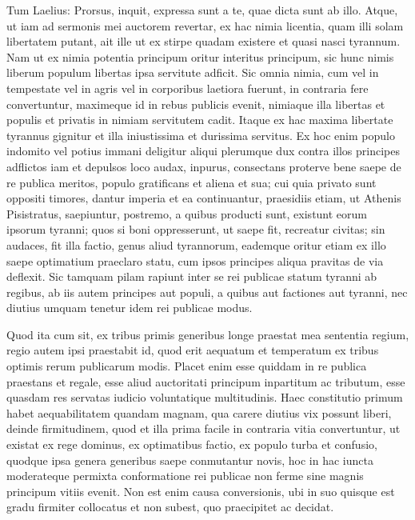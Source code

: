  Tum Laelius: Prorsus, inquit, expressa sunt a te, quae dicta sunt ab illo. Atque, ut iam ad sermonis mei auctorem revertar, ex hac nimia licentia, quam illi solam libertatem putant, ait ille ut ex stirpe quadam existere et quasi nasci tyrannum. Nam ut ex nimia potentia principum oritur interitus principum, sic hunc nimis liberum populum libertas ipsa servitute adficit. Sic omnia nimia, cum vel in tempestate vel in agris vel in corporibus laetiora fuerunt, in contraria fere convertuntur, maximeque id in rebus publicis evenit, nimiaque illa libertas et populis et privatis in nimiam servitutem cadit. Itaque ex hac maxima libertate tyrannus gignitur et illa iniustissima et durissima servitus. Ex hoc enim populo indomito vel potius immani deligitur aliqui plerumque dux contra illos principes adflictos iam et depulsos loco audax, inpurus, consectans proterve bene saepe de re publica meritos, populo gratificans et aliena et sua; cui quia privato sunt oppositi timores, dantur imperia et ea continuantur, praesidiis etiam, ut Athenis Pisistratus, saepiuntur, postremo, a quibus producti sunt, existunt eorum ipsorum tyranni; quos si boni oppresserunt, ut saepe fit, recreatur civitas; sin audaces, fit illa factio, genus aliud tyrannorum, eademque oritur etiam ex illo saepe optimatium praeclaro statu, cum ipsos principes aliqua pravitas de via deflexit. Sic tamquam pilam rapiunt inter se rei publicae statum tyranni ab regibus, ab iis autem principes aut populi, a quibus aut factiones aut tyranni, nec diutius umquam tenetur idem rei publicae modus.

 Quod ita cum sit, ex tribus primis generibus longe praestat mea sententia regium, regio autem ipsi praestabit id, quod erit aequatum et temperatum ex tribus optimis rerum publicarum modis. Placet enim esse quiddam in re publica praestans et regale, esse aliud auctoritati principum inpartitum ac tributum, esse quasdam res servatas iudicio voluntatique multitudinis. Haec constitutio primum habet aequabilitatem quandam magnam, qua carere diutius vix possunt liberi, deinde firmitudinem, quod et illa prima facile in contraria vitia convertuntur, ut existat ex rege dominus, ex optimatibus factio, ex populo turba et confusio, quodque ipsa genera generibus saepe conmutantur novis, hoc in hac iuncta moderateque permixta conformatione rei publicae non ferme sine magnis principum vitiis evenit. Non est enim causa conversionis, ubi in suo quisque est gradu firmiter collocatus et non subest, quo praecipitet ac decidat.

